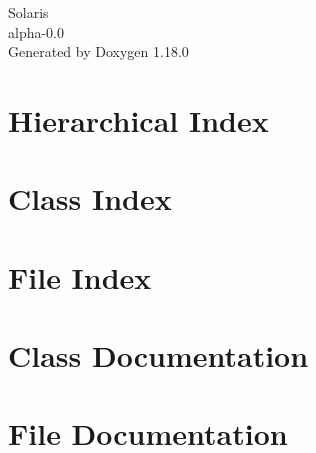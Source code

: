 \documentclass[twoside]{book}
\newcommand{\+}{\discretionary{\mbox{\scriptsize$\hookleftarrow$}}{}{}}
\newcommand{\clearemptydoublepage}{%
    \newpage{\pagestyle{empty}\cleardoublepage}%
  }
\begin{document}
  \raggedbottom
    \hypersetup{pageanchor=false,
                bookmarksnumbered=true,
                pdfencoding=unicode
               }
  \begin{titlepage}
  \vspace*{7cm}
  \begin{center}%
  {\Large Solaris}\\
  [1ex]\large alpha-\/0.\+0 \\
  \vspace*{1cm}
  {\large Generated by Doxygen 1.18.0}\\
  \end{center}
  \end{titlepage}
  \clearemptydoublepage
  \tableofcontents
  \clearemptydoublepage
  \hypersetup{pageanchor=true}






\chapter{Hierarchical Index}

\chapter{Class Index}

\chapter{File Index}

\chapter{Class Documentation}









\chapter{File Documentation}











  \backmatter
  \newpage
  \clearemptydoublepage
  \printindex
\end{document}
